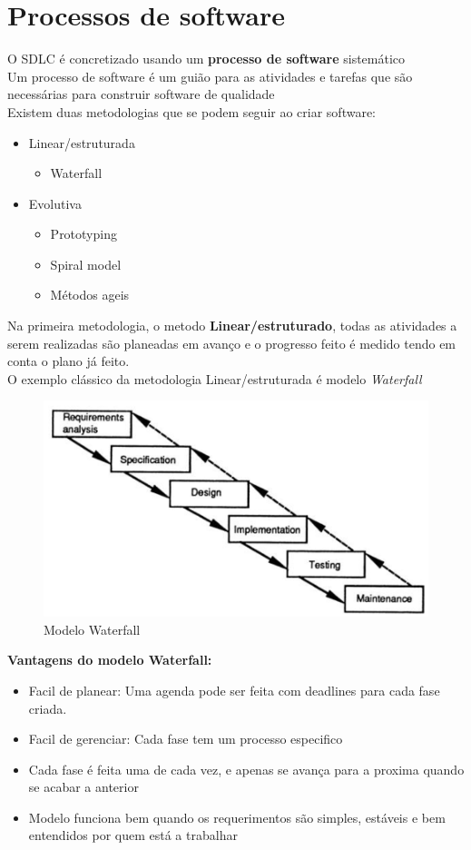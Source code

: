 \documentclass[a4paper, 12pt, onecolumn, oneside]{scrartcl}
\begin{document}
\section{Processos de software}
O SDLC é concretizado usando um \textbf{processo de software} sistemático\\
Um processo de software é um guião para as atividades e tarefas que são necessárias para construir software de qualidade\\
Existem duas metodologias que se podem seguir ao criar software:
\begin{itemize}
  \item Linear/estruturada
  \begin{itemize}
    \item Waterfall
  \end{itemize}
  \item Evolutiva
  \begin{itemize}
    \item Prototyping
    \item Spiral model
    \item Métodos ageis
  \end{itemize}
\end{itemize}
Na primeira metodologia, o metodo \textbf{Linear/estruturado}, todas as atividades a serem realizadas são planeadas em avanço 
e o progresso feito é medido tendo em conta o plano já feito.
\\O exemplo clássico da metodologia Linear/estruturada é modelo \textit{Waterfall}\\ 
\begin{figure}[H]
  \centering
  \includegraphics[width=1\textwidth]{waterfall-model.png}
  \caption{Modelo Waterfall}\label{fig1}
\end{figure}
\textbf{Vantagens do modelo Waterfall:}
\begin{itemize}
  \item Facil de planear: Uma agenda pode ser feita com deadlines para cada fase criada.
  \item Facil de  gerenciar: Cada fase tem um processo especifico
  \item Cada fase é feita uma de cada vez, e apenas se avança para a proxima quando se acabar a anterior
  \item Modelo funciona bem quando os requerimentos são simples, estáveis e bem entendidos por quem está a trabalhar\\
\end{itemize}
\end{document}

